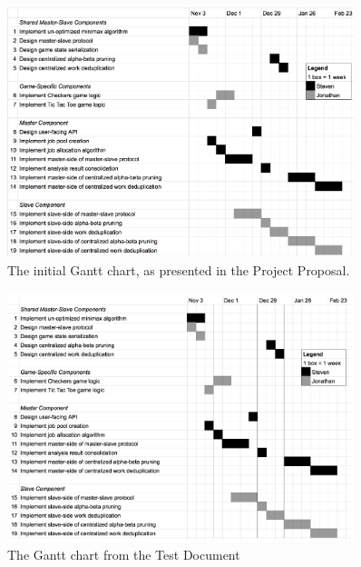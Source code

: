 \documentclass[pdftex,12pt,a4paper]{article}
\begin{document}
\begin{figure}[H]
\begin{center}
\includegraphics[width=0.9\textwidth]{img/gantt-proposal}
\caption{The initial Gantt chart, as presented in the Project Proposal.}
\end{center}
\end{figure}

\begin{figure}[H]
\begin{center}
\includegraphics[width=0.9\textwidth]{img/gantt-test}
\caption{The Gantt chart from the Test Document}
\end{center}
\end{figure}
\end{document}
